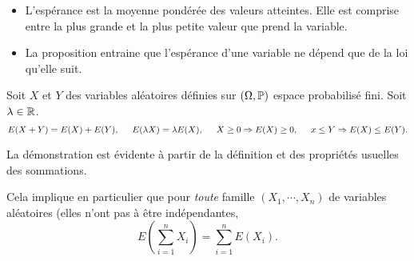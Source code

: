 \begin{rems}
\begin{itemize}
 \item L'espérance est la moyenne pondérée des valeurs atteintes. Elle est comprise entre la plus grande et la plus petite valeur que prend la variable.
 \item La proposition entraine que l'espérance d'une variable ne dépend que de la loi qu'elle suit. 
\end{itemize}
\end{rems}
\begin{prop}
  Soit $X$ et $Y$ des variables aléatoires définies sur $(\Omega,\mathbb{P})$ espace probabilisé fini. Soit $\lambda \in \mathbb{R}$.
\[
  E(X + Y) = E(X) + E(Y), \hspace{0.5cm} E(\lambda X) = \lambda E(X),\hspace{0.5cm} X \geq 0 \Rightarrow E(X) \geq 0, \hspace{0.5cm} x \leq Y \Rightarrow E(X) \leq E(Y).
\]
\end{prop}
\begin{demo}
  La démonstration est évidente à partir de la définition et des propriétés usuelles des sommations.
\end{demo}
\begin{rem}
Cela implique en particulier que pour \emph{toute} famille $(X_1, \cdots, X_n)$ de variables aléatoires (elles n'ont pas à être indépendantes,
\[
 E(\sum_{i=1}^{n}X_i) = \sum_{i=1}^nE(X_i).
\]  
\end{rem}

